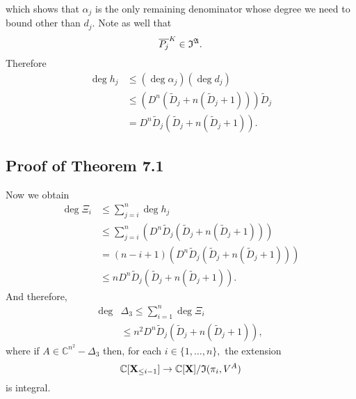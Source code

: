 \documentclass[sigconf]{acmart}
\def\pjb{\overline{P_{j}}}
\def\C{\mathbb{C}}
\def\Dt{\widetilde{D}}
\def\I{\frak{I}}
\def\A{\frak{A}}
\begin{document}
%
which shows that $\alpha_j$ is the only remaining denominator whose degree we need to bound other than $d_j$. Note as well that
\[
\pjb^K \in \I^{\A}.
\]
Therefore 
%
\begin{align*}
\deg h_j &\leq \left(\deg \alpha_j\right)\left(\deg d_j\right)\\
    &\leq \left(D^n\left(\Dt_j + n\left(\Dt_j+1\right) \right)\right)\Dt_j\\
    &=D^n\Dt_j\left(\Dt_j + n\left(\Dt_j+1\right) \right).
\end{align*}
%
\subsection{Proof of Theorem 7.1}
%
Now we obtain
%
\begin{align*}
    \deg \Xi_i 
    &\leq \sum_{j=i}^n \deg h_j\\
    &\leq  \sum_{j=i}^n \left( D^n\Dt_j\left(\Dt_j + n\left(\Dt_j+1\right) \right) \right) \\
    &=  (n-i+1)\left( D^n\Dt_j\left(\Dt_j + n\left(\Dt_j+1\right) \right) \right)\\
    &\leq  n D^n\Dt_j\left(\Dt_j + n\left(\Dt_j+1\right) \right) .
\end{align*}
%
And therefore,  
%
\begin{align*}
    \deg& \Delta_3 \leq \sum_{i=1}^n \deg \Xi_i\\
    &\leq n^2 D^n\Dt_j\left(\Dt_j + n\left(\Dt_j+1\right) \right),
\end{align*}
%
where if $A \in \C^{n^2} - \Delta_3$ then, for each $i \in \{1,\hdots,n\},$ the extension 
\[
\C[\textbf{X}_{\leq i-1}]\rightarrow\C[\textbf{X}]/\frak{I}(\pi_i,V^A)
\]
is integral.
%
%
%
%
\end{document}
